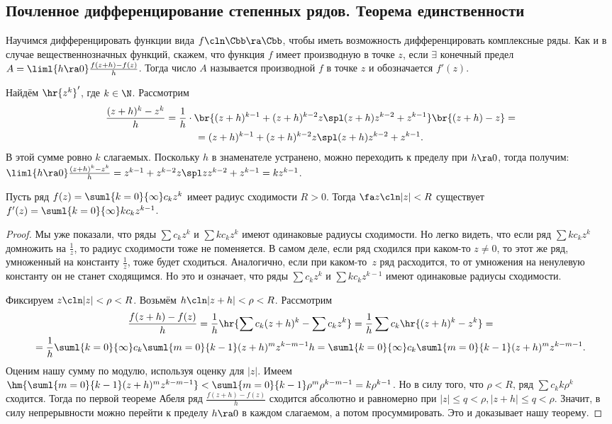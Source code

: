 \documentclass[a4paper]{article}
\begin{document}
\subsection{Почленное дифференцирование степенных рядов. Теорема единственности}
Научимся дифференцировать функции вида $f\cln \Cbb \ra \Cbb$, чтобы иметь возможность
дифференцировать комплексные ряды. Как и в случае вещественнозначных функций, скажем, что
функция $f$ имеет производную в точке $z$, если $\exi$ конечный предел
$A=\liml{h \ra 0} \frac{f(z+h)-f(z)}{h}$. Тогда число $A$ называется производной $f$ в
точке $z$ и обозначается $f'(z)$.

Найдём $\hr{z^k}'$, где $k \in \N$. Рассмотрим
\begin{multline*}
\frac{(z+h)^k-z^k}{h}=\frac{1}{h} \cdot
\br{(z+h)^{k-1} + (z+h)^{k-2}z \spl (z+h)z^{k-2} + z^{k-1}}\br{(z+h)-z} =\\
=(z+h)^{k-1} + (z+h)^{k-2}z \spl (z+h)z^{k-2} + z^{k-1}.
\end{multline*}
В этой сумме ровно $k$ слагаемых. Поскольку $h$ в знаменателе
устранено, можно переходить к пределу при $h \ra 0$, тогда получим:
$\liml{h \ra 0} \frac{(z+h)^k-z^k}{h} = z^{k-1}+ z^{k-2}z \spl zz^{k-2} + z^{k-1} = kz^{k-1}$.

\begin{theorem}
Пусть ряд $f(z)=\suml{k=0}{\infty}c_kz^k$ имеет радиус сходимости $R>0$. Тогда $\fa z\cln |z| <R$
существует $f'(z)= \suml{k=0}{\infty} k c_k z^{k-1}$.
\end{theorem}
\begin{proof}
Мы уже показали, что ряды $\sum c_kz^k$ и $\sum kc_kz^k$ имеют одинаковые радиусы сходимости. Но
легко видеть, что если ряд $\sum kc_kz^k$ домножить на $\frac{1}{z}$, то радиус сходимости тоже
не поменяется. В самом деле, если ряд сходился при каком-то $z \neq 0$, то этот же ряд,
умноженный на константу $\frac{1}{z}$, тоже будет сходиться. Аналогично, если при каком-то~$z$
ряд расходится, то от умножения на ненулевую константу он не станет сходящимся. Но это и означает, что ряды
$\sum c_kz^k$ и $\sum kc_kz^{k-1}$ имеют одинаковые радиусы сходимости.

Фиксируем $z\cln |z| < \rho < R$. Возьмём $h\cln |z+h| < \rho<R$. Рассмотрим
\begin{multline*}
\frac{f(z+h)-f(z)}{h}= \frac{1}{h}\hr{ \sum c_k(z+h)^k-\sum c_kz^k} =\frac{1}{h}\sum c_k\hr{ (z+h)^k-z^k} =\\=
\frac{1}{h}\suml{k=0}{\infty}c_k\suml{m=0}{k-1}(z+h)^mz^{k-m-1}h=\suml{k=0}{\infty}c_k\suml{m=0}{k-1}(z+h)^mz^{k-m-1}.
\end{multline*}
Оценим нашу сумму по модулю, используя оценку для $|z|$. Имеем
$\hm{\suml{m=0}{k-1}(z+h)^mz^{k-m-1}} < \suml{m=0}{k-1}\rho^m\rho^{k-m-1}=k\rho^{k-1}$. Но
в силу того, что $\rho < R$, ряд $\sum c_kk\rho^k$ сходится. Тогда по первой теореме Абеля
ряд $\frac{f(z+h)-f(z)}{h}$ сходится абсолютно и равномерно при
$|z|\le q < \rho, |z+h| \le q < \rho$. Значит, в силу непрерывности можно перейти к
пределу $h \ra 0$ в каждом слагаемом, а потом просуммировать. Это и доказывает нашу теорему.
\end{proof}
\end{document}
